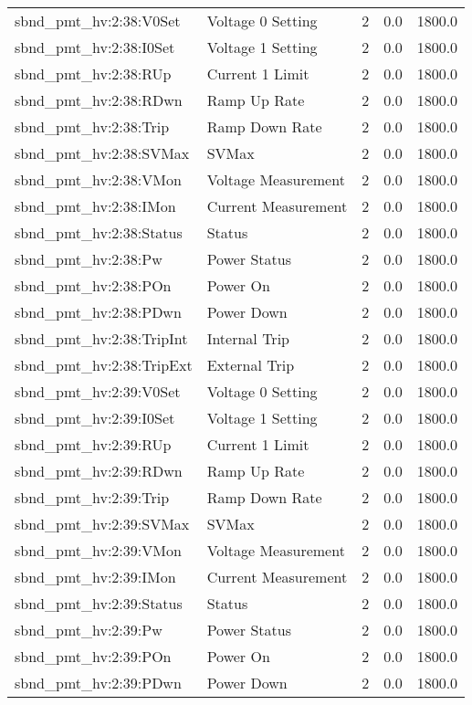 \begin{center}
\begin{longtable}{l | l l l l }
sbnd\_pmt\_hv:2:38:V0Set & Voltage 0 Setting & 2 & 0.0 & 1800.0\\ 
sbnd\_pmt\_hv:2:38:I0Set & Voltage 1 Setting & 2 & 0.0 & 1800.0\\ 
sbnd\_pmt\_hv:2:38:RUp & Current 1 Limit & 2 & 0.0 & 1800.0\\ 
sbnd\_pmt\_hv:2:38:RDwn & Ramp Up Rate & 2 & 0.0 & 1800.0\\ 
sbnd\_pmt\_hv:2:38:Trip & Ramp Down Rate & 2 & 0.0 & 1800.0\\ 
sbnd\_pmt\_hv:2:38:SVMax & SVMax & 2 & 0.0 & 1800.0\\ 
sbnd\_pmt\_hv:2:38:VMon & Voltage Measurement & 2 & 0.0 & 1800.0\\ 
sbnd\_pmt\_hv:2:38:IMon & Current Measurement & 2 & 0.0 & 1800.0\\ 
sbnd\_pmt\_hv:2:38:Status & Status & 2 & 0.0 & 1800.0\\ 
sbnd\_pmt\_hv:2:38:Pw & Power Status & 2 & 0.0 & 1800.0\\ 
sbnd\_pmt\_hv:2:38:POn & Power On & 2 & 0.0 & 1800.0\\ 
sbnd\_pmt\_hv:2:38:PDwn & Power Down & 2 & 0.0 & 1800.0\\ 
sbnd\_pmt\_hv:2:38:TripInt & Internal Trip & 2 & 0.0 & 1800.0\\ 
sbnd\_pmt\_hv:2:38:TripExt & External Trip & 2 & 0.0 & 1800.0\\ 
sbnd\_pmt\_hv:2:39:V0Set & Voltage 0 Setting & 2 & 0.0 & 1800.0\\ 
sbnd\_pmt\_hv:2:39:I0Set & Voltage 1 Setting & 2 & 0.0 & 1800.0\\ 
sbnd\_pmt\_hv:2:39:RUp & Current 1 Limit & 2 & 0.0 & 1800.0\\ 
sbnd\_pmt\_hv:2:39:RDwn & Ramp Up Rate & 2 & 0.0 & 1800.0\\ 
sbnd\_pmt\_hv:2:39:Trip & Ramp Down Rate & 2 & 0.0 & 1800.0\\ 
sbnd\_pmt\_hv:2:39:SVMax & SVMax & 2 & 0.0 & 1800.0\\ 
sbnd\_pmt\_hv:2:39:VMon & Voltage Measurement & 2 & 0.0 & 1800.0\\ 
sbnd\_pmt\_hv:2:39:IMon & Current Measurement & 2 & 0.0 & 1800.0\\ 
sbnd\_pmt\_hv:2:39:Status & Status & 2 & 0.0 & 1800.0\\ 
sbnd\_pmt\_hv:2:39:Pw & Power Status & 2 & 0.0 & 1800.0\\ 
sbnd\_pmt\_hv:2:39:POn & Power On & 2 & 0.0 & 1800.0\\ 
sbnd\_pmt\_hv:2:39:PDwn & Power Down & 2 & 0.0 & 1800.0\\ 

\end{longtable}
\end{center}
